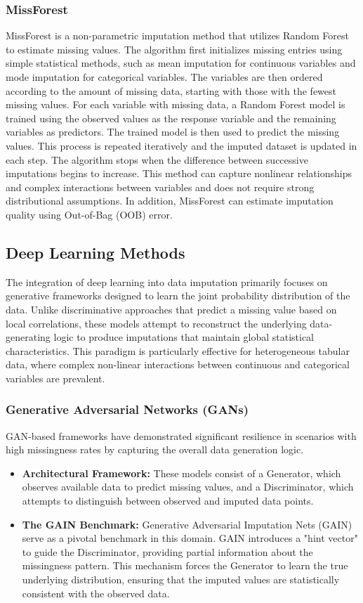 \documentclass[twocolumn, 9pt]{extarticle}
\begin{document}
\subsubsection{MissForest}
MissForest is a non-parametric imputation method that utilizes Random Forest to estimate missing values. The algorithm first initializes missing entries using simple statistical methods, such as mean imputation for continuous variables and mode imputation for categorical variables. The variables are then ordered according to the amount of missing data, starting with those with the fewest missing values. For each variable with missing data, a Random Forest model is trained using the observed values as the response variable and the remaining variables as predictors. The trained model is then used to predict the missing values. This process is repeated iteratively and the imputed dataset is updated in each step. The algorithm stops when the difference between successive imputations begins to increase. This method can capture nonlinear relationships and complex interactions between variables and does not require strong distributional assumptions. In addition, MissForest can estimate imputation quality using Out-of-Bag (OOB) error.\cite{sun2023deep}\cite{Stekhoven2012}

\subsection{Deep Learning Methods}
The integration of deep learning into data imputation primarily focuses on generative frameworks designed to learn the joint probability distribution of the data. Unlike discriminative approaches that predict a missing value based on local correlations, these models attempt to reconstruct the underlying data-generating logic to produce imputations that maintain global statistical characteristics. This paradigm is particularly effective for heterogeneous tabular data, where complex non-linear interactions between continuous and categorical variables are prevalent.

\subsubsection{Generative Adversarial Networks (GANs)}
GAN-based frameworks have demonstrated significant resilience in scenarios with high missingness rates by capturing the overall data generation logic.\cite{Yoon2018}
\begin{itemize}
    \item \textbf{Architectural Framework:} These models consist of a Generator, which observes available data to predict missing values, and a Discriminator, which attempts to distinguish between observed and imputed data points.
    \item \textbf{The GAIN Benchmark:} Generative Adversarial Imputation Nets (GAIN) serve as a pivotal benchmark in this domain. GAIN introduces a "hint vector" to guide the Discriminator, providing partial information about the missingness pattern. This mechanism forces the Generator to learn the true underlying distribution, ensuring that the imputed values are statistically consistent with the observed data. 
\end{itemize}
\end{document}
